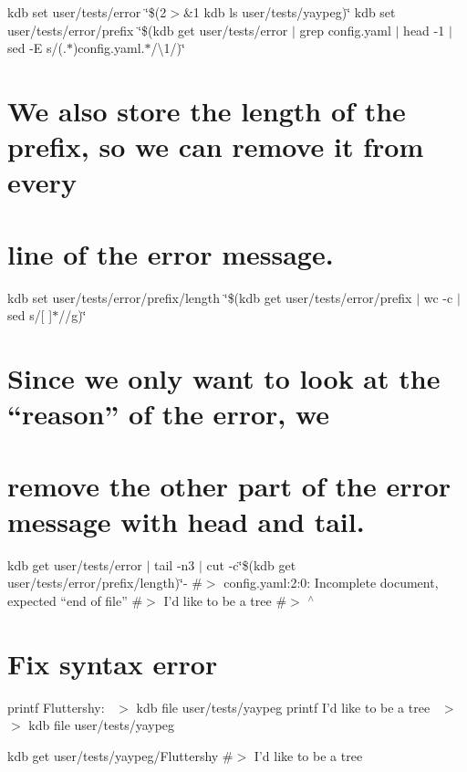 kdb set user/tests/error \char`\"{}\$(2$>$\&1 kdb ls user/tests/yaypeg)\char`\"{} kdb set user/tests/error/prefix \char`\"{}\$(kdb get user/tests/error $\vert$ grep \textquotesingle{}config.\+yaml\textquotesingle{} $\vert$ head -\/1 $\vert$ sed -\/\+E \textquotesingle{}s/(.$\ast$)config.\+yaml.$\ast$/\textbackslash{}1/\textquotesingle{})\char`\"{} \section*{We also store the length of the prefix, so we can remove it from every}

\section*{line of the error message.}

kdb set user/tests/error/prefix/length \char`\"{}\$(kdb get user/tests/error/prefix $\vert$ wc -\/c $\vert$ sed \textquotesingle{}s/\mbox{[} \mbox{]}$\ast$//g\textquotesingle{})\char`\"{}

\section*{Since we only want to look at the “reason” of the error, we}

\section*{remove the other part of the error message with {\ttfamily head} and {\ttfamily tail}.}

kdb get user/tests/error $\vert$ tail -\/n3 $\vert$ cut -\/c\char`\"{}\$(kdb get user/tests/error/prefix/length)\char`\"{}-\/ \#$>$ config.\+yaml\+:2\+:0\+: Incomplete document, expected “end of file” \#$>$ I’d like to be a tree \#$>$ $^\wedge$

\section*{Fix syntax error}

printf \textquotesingle{}Fluttershy\+:~\newline
\textquotesingle{} $>$ {\ttfamily kdb file user/tests/yaypeg} printf \textquotesingle{} I’d like to be a tree~\newline
\textquotesingle{} $>$$>$ {\ttfamily kdb file user/tests/yaypeg}

kdb get user/tests/yaypeg/\+Fluttershy \#$>$ I’d like to be a tree

